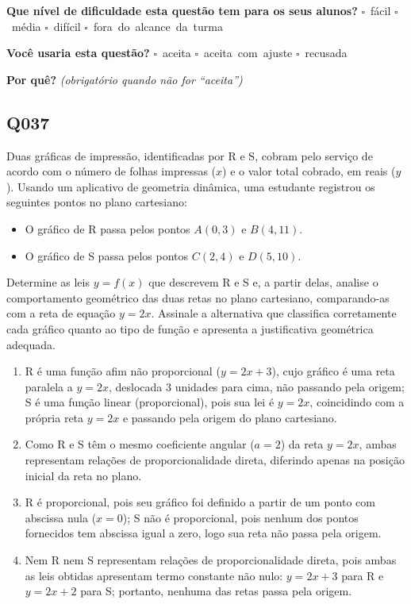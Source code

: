 \documentclass[11pt,a4paper]{article}
\begin{document}
\textbf{Que nível de dificuldade esta questão tem para os seus alunos?}\quad
\mbox{$\square$~fácil} \quad \mbox{$\square$~média} \quad
\mbox{$\square$~difícil} \quad \mbox{$\square$~fora do alcance da turma}

\textbf{Você usaria esta questão?}\quad
\mbox{$\square$~aceita} \quad \mbox{$\square$~aceita com ajuste} \quad
\mbox{$\square$~recusada}

\textbf{Por quê?} \emph{(obrigatório quando não for ``aceita'')}

\underline{\hspace{\linewidth}}

\underline{\hspace{\linewidth}}
\vspace{0.6em}

\begin{samepage}
\subsection*{Q037}
Duas gráficas de impressão, identificadas por R e S, cobram pelo serviço de acordo com o número de folhas impressas ($x$) e o valor total cobrado, em reais ($y$). Usando um aplicativo de geometria dinâmica, uma estudante registrou os seguintes pontos no plano cartesiano:

\begin{itemize}[nosep,leftmargin=*]
\item O gráfico de R passa pelos pontos $A(0,3)$ e $B(4,11)$.
\item O gráfico de S passa pelos pontos $C(2,4)$ e $D(5,10)$.
\end{itemize}

Determine as leis $y = f(x)$ que descrevem R e S e, a partir delas, analise o comportamento geométrico das duas retas no plano cartesiano, comparando-as com a reta de equação $y = 2x$. Assinale a alternativa que classifica corretamente cada gráfico quanto ao tipo de função e apresenta a justificativa geométrica adequada.
\begin{enumerate}[label=(\alph*),nosep,leftmargin=*]
\item R é uma função afim não proporcional ($y=2x+3$), cujo gráfico é uma reta paralela a $y=2x$, deslocada 3 unidades para cima, não passando pela origem; S é uma função linear (proporcional), pois sua lei é $y=2x$, coincidindo com a própria reta $y=2x$ e passando pela origem do plano cartesiano.
\item Como R e S têm o mesmo coeficiente angular ($a=2$) da reta $y=2x$, ambas representam relações de proporcionalidade direta, diferindo apenas na posição inicial da reta no plano.
\item R é proporcional, pois seu gráfico foi definido a partir de um ponto com abscissa nula ($x=0$); S não é proporcional, pois nenhum dos pontos fornecidos tem abscissa igual a zero, logo sua reta não passa pela origem.
\item Nem R nem S representam relações de proporcionalidade direta, pois ambas as leis obtidas apresentam termo constante não nulo: $y=2x+3$ para R e $y=2x+2$ para S; portanto, nenhuma das retas passa pela origem.
\end{enumerate}


\end{samepage}
\end{document}
